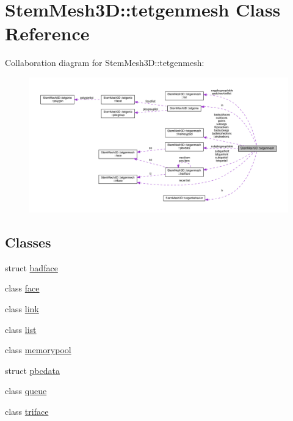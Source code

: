 \hypertarget{classStemMesh3D_1_1tetgenmesh}{}\section{Stem\+Mesh3D\+:\+:tetgenmesh Class Reference}
\label{classStemMesh3D_1_1tetgenmesh}


Collaboration diagram for Stem\+Mesh3D\+:\+:tetgenmesh\+:\nopagebreak
\begin{figure}[H]
\begin{center}
\leavevmode
\includegraphics[width=350pt]{classStemMesh3D_1_1tetgenmesh__coll__graph}
\end{center}
\end{figure}
\subsection*{Classes}
\begin{DoxyCompactItemize}
\item 
struct \hyperlink{structStemMesh3D_1_1tetgenmesh_1_1badface}{badface}
\item 
class \hyperlink{classStemMesh3D_1_1tetgenmesh_1_1face}{face}
\item 
class \hyperlink{classStemMesh3D_1_1tetgenmesh_1_1link}{link}
\item 
class \hyperlink{classStemMesh3D_1_1tetgenmesh_1_1list}{list}
\item 
class \hyperlink{classStemMesh3D_1_1tetgenmesh_1_1memorypool}{memorypool}
\item 
struct \hyperlink{structStemMesh3D_1_1tetgenmesh_1_1pbcdata}{pbcdata}
\item 
class \hyperlink{classStemMesh3D_1_1tetgenmesh_1_1queue}{queue}
\item 
class \hyperlink{classStemMesh3D_1_1tetgenmesh_1_1triface}{triface}
\end{DoxyCompactItemize}
